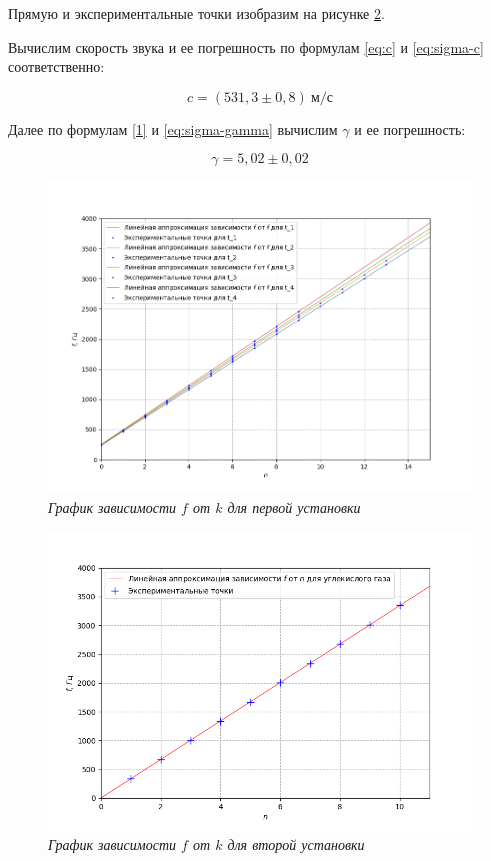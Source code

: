 \documentclass[a4paper,12pt]{article}
\begin{document}
Прямую и экспериментальные точки изобразим на рисунке \ref{pic:graph-2}.

Вычислим скорость звука и ее погрешность по формулам \eqref{eq:c} и \eqref{eq:sigma-c} соответственно:

\begin{equation*}
    c = (531,3 \pm 0,8) \ \text{м/с}
\end{equation*}

Далее по формулам \eqref{1} и \eqref{eq:sigma-gamma} вычислим $\gamma$ и ее погрешность:

\begin{equation*}
    \gamma = 5,02 \pm 0,02
\end{equation*}


\begin{figure}[h!]
        \centering
	\includegraphics[width=1.1\textwidth]{graph-1.png}
	\caption{\textit{График зависимости $f$ от $k$ для первой установки}}
	\label{pic:graph-1}
\end{figure}

\begin{figure}[h!]
        \centering
	\includegraphics[width=1.1\textwidth]{graph-2.png}
	\caption{\textit{График зависимости $f$ от $k$ для второй установки}}
	\label{pic:graph-2}
\end{figure}
\end{document}
